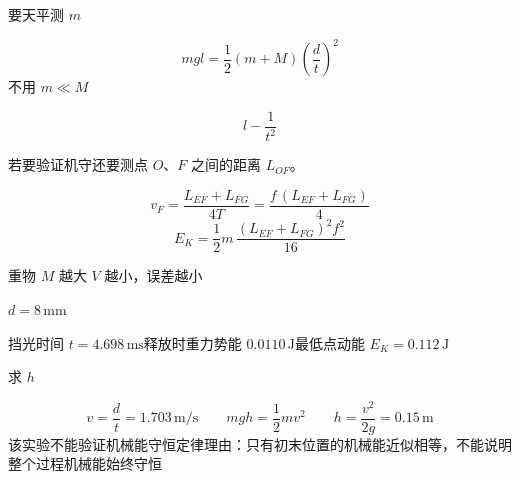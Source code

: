 要天平测 $m$

\[ mgl=\frac12(m+M)\left(\frac{d}{t}\right)^2 \]
不用 $m\ll M$

\[ l-\frac{1}{t^2} \]

若要验证机守还要测点 $O$、$F$ 之间的距离 $L_{OF}$。

\[ v_F=\frac{L_{EF}+L_{FG}}{4T}=\frac{f\,(L_{EF}+L_{FG})}{4} \]
\[ E_K=\frac12 m\,\frac{(L_{EF}+L_{FG})^2f^2}{16} \]


重物 $M$ 越大 $V$ 越小，误差越小 %
\begin{problem}

$d=8\,\mathrm{mm}$

挡光时间 $t=4.698\,\mathrm{ms}$\quad 释放时重力势能 $0.0110\,\mathrm{J}$\quad 最低点动能 $E_K=0.112\,\mathrm{J}$ %

求 $h$
\begin{solution}
\[ v=\frac{d}{t}=1.703\,\mathrm{m/s}\qquad mgh=\frac12mv^2\qquad h=\frac{v^2}{2g}=0.15\,\mathrm{m} \]
该实验不能验证机械能守恒定律\quad 理由：只有初末位置的机械能近似相等，不能说明整个过程机械能始终守恒
\end{solution}
\end{problem}

